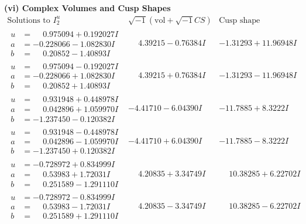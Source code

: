 \documentclass[1p]{elsarticle_modified}
\theoremstyle{definition}
\newcommand{\I}{\sqrt{-1}}
\begin{document}
\newpage\flushleft \textbf{(vi) Complex Volumes and Cusp Shapes}
$$\begin{array}{c|c|c}  
\text{Solutions to }I^u_{2}& \I (\text{vol} + \sqrt{-1}CS) & \text{Cusp shape}\\
 \hline 
\begin{aligned}
u &= \phantom{-}0.975094 + 0.192027 I \\
a &= -0.228066 - 1.082830 I \\
b &= \phantom{-}0.20852 - 1.40893 I\end{aligned}
 & \phantom{-}4.39215 - 0.76384 I & -1.31293 + 11.96948 I \\ \hline\begin{aligned}
u &= \phantom{-}0.975094 - 0.192027 I \\
a &= -0.228066 + 1.082830 I \\
b &= \phantom{-}0.20852 + 1.40893 I\end{aligned}
 & \phantom{-}4.39215 + 0.76384 I & -1.31293 - 11.96948 I \\ \hline\begin{aligned}
u &= \phantom{-}0.931948 + 0.448978 I \\
a &= \phantom{-}0.042896 + 1.059970 I \\
b &= -1.237450 - 0.120382 I\end{aligned}
 & -4.41710 - 6.04390 I & -11.7885 + 8.3222 I \\ \hline\begin{aligned}
u &= \phantom{-}0.931948 - 0.448978 I \\
a &= \phantom{-}0.042896 - 1.059970 I \\
b &= -1.237450 + 0.120382 I\end{aligned}
 & -4.41710 + 6.04390 I & -11.7885 - 8.3222 I \\ \hline\begin{aligned}
u &= -0.728972 + 0.834999 I \\
a &= \phantom{-}0.53983 + 1.72031 I \\
b &= \phantom{-}0.251589 - 1.291110 I\end{aligned}
 & \phantom{-}4.20835 + 3.34749 I & \phantom{-}10.38285 + 6.22702 I \\ \hline\begin{aligned}
u &= -0.728972 - 0.834999 I \\
a &= \phantom{-}0.53983 - 1.72031 I \\
b &= \phantom{-}0.251589 + 1.291110 I\end{aligned}
 & \phantom{-}4.20835 - 3.34749 I & \phantom{-}10.38285 - 6.22702 I \\ \hline\begin{aligned}

\end{aligned}
\end{array}$$
\end{document}

